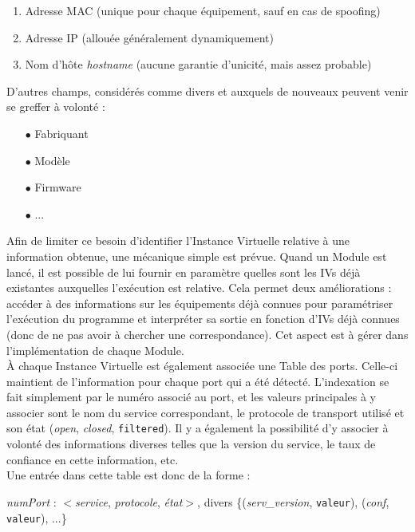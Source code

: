 \documentclass[]{article}
\begin{document}
\begin{enumerate}
\item Adresse MAC (unique pour chaque équipement, sauf en cas de spoofing)
\item Adresse IP (allouée généralement dynamiquement)
\item Nom d'hôte \textit{hostname} (aucune garantie d'unicité, mais assez probable)
\end{enumerate}

\vspace{0.1cm}

D'autres champs, considérés comme divers et auxquels de nouveaux peuvent venir se greffer à volonté :

\begin{itemize}
\item[$\bullet$] Fabriquant
\item[$\bullet$] Modèle
\item[$\bullet$] Firmware
\item[$\bullet$] ...
\end{itemize}

\vspace{0.4cm}

Afin de limiter ce besoin d'identifier l'Instance Virtuelle relative à une information obtenue, une mécanique simple est prévue. Quand un Module est lancé, il est possible de lui fournir en paramètre quelles sont les IVs déjà existantes auxquelles l'exécution est relative. Cela permet deux améliorations : accéder à des informations sur les équipements déjà connues pour paramétriser l'exécution du programme et interpréter sa sortie en fonction d'IVs déjà connues (donc de ne pas avoir à chercher une correspondance). Cet aspect est à gérer dans l'implémentation de chaque Module.\\  

À chaque Instance Virtuelle est également associée une Table des ports. Celle-ci maintient de l'information pour chaque port qui a été détecté. L'indexation se fait simplement par le numéro associé au port, et les valeurs principales à y associer sont le nom du service correspondant, le protocole de transport utilisé et son état (\textit{open}, \textit{closed}, \texttt{filtered}). Il y a également la possibilité d'y associer à volonté des informations diverses telles que la version du service, le taux de confiance en cette information, etc.\\

\indent Une entrée dans cette table est donc de la forme :
\begin{center}
\textit{numPort} : $<$\textit{service}, \textit{protocole}, \textit{état}$>$, divers \{(\textit{serv\_version}, \texttt{valeur}), (\textit{conf}, \texttt{valeur}), ...\}
\end{center}
\end{document}
